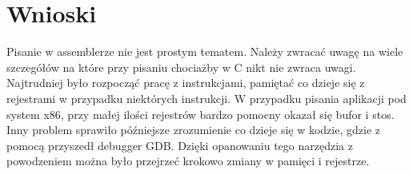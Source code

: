 \section{Wnioski}
Pisanie w assemblerze nie jest prostym tematem. Należy zwracać uwagę na wiele szczegółów na które przy pisaniu chociażby w C nikt nie zwraca uwagi. Najtrudniej było rozpocząć pracę z instrukcjami, pamiętać co dzieje się z rejestrami w przypadku niektórych instrukcji. W przypadku pisania aplikacji pod system x86, przy małej ilości rejestrów bardzo pomocny okazał się bufor i stos. Inny problem sprawiło późniejsze zrozumienie co dzieje się w kodzie, gdzie z pomocą przyszedł debugger GDB. Dzięki opanowaniu tego narzędzia z powodzeniem można było przejrzeć krokowo zmiany w pamięci i rejestrze.